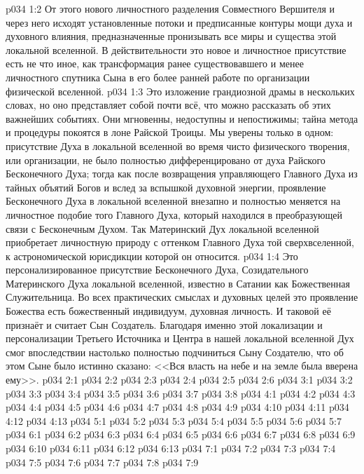 \vs p034 1:2 От этого нового личностного разделения Совместного Вершителя и через него исходят установленные потоки и предписанные контуры мощи духа и духовного влияния, предназначенные пронизывать все миры и существа этой локальной вселенной. В действительности это новое и личностное присутствие есть не что иное, как трансформация ранее существовавшего и менее личностного спутника Сына в его более ранней работе по организации физической вселенной.
\vs p034 1:3 \pc Это изложение грандиозной драмы в нескольких словах, но оно представляет собой почти всё, что можно рассказать об этих важнейших событиях. Они мгновенны, недоступны и непостижимы; тайна метода и процедуры покоятся в лоне Райской Троицы. Мы уверены только в одном: присутствие Духа в локальной вселенной во время чисто физического творения, или организации, не было полностью дифференцировано от духа Райского Бесконечного Духа; тогда как после возвращения управляющего Главного Духа из тайных объятий Богов и вслед за вспышкой духовной энергии, проявление Бесконечного Духа в локальной вселенной внезапно и полностью меняется на личностное подобие того Главного Духа, который находился в преобразующей связи с Бесконечным Духом. Так Материнский Дух локальной вселенной приобретает личностную природу с оттенком Главного Духа той сверхвселенной, к астрономической юрисдикции которой он относится.
\vs p034 1:4 Это персонализированное присутствие Бесконечного Духа, Созидательного Материнского Духа локальной вселенной, известно в Сатании как Божественная Служительница. Во всех практических смыслах и духовных целей это проявление Божества есть божественный индивидуум, духовная личность. И таковой её признаёт и считает Сын Создатель. Благодаря именно этой локализации и персонализации Третьего Источника и Центра в нашей локальной вселенной Дух смог впоследствии настолько полностью подчиниться Сыну Создателю, что об этом Сыне было истинно сказано: <<Вся власть на небе и на земле была вверена ему>>.
\vs p034 2:1 
\vs p034 2:2 
\vs p034 2:3 \pc 
\vs p034 2:4 \pc 
\vs p034 2:5 
\vs p034 2:6 \pc 
{}
\vs p034 3:1 
\vs p034 3:2 
\vs p034 3:3 \pc 
\vs p034 3:4 
\vs p034 3:5 \pc 
\vs p034 3:6 
\vs p034 3:7 \pc 
\vs p034 3:8 
\vs p034 4:1 
\vs p034 4:2 
\vs p034 4:3 
\vs p034 4:4 
\vs p034 4:5 \pc 
\vs p034 4:6 
\vs p034 4:7 
\vs p034 4:8 \pc 
\vs p034 4:9 
\vs p034 4:10 \pc 
\vs p034 4:11 \pc 
\vs p034 4:12 
\vs p034 4:13 
\vs p034 5:1 
\vs p034 5:2 
\vs p034 5:3 \pc 
\vs p034 5:4 
\vs p034 5:5 
\vs p034 5:6 \pc 
\vs p034 5:7 
\vs p034 6:1 
\vs p034 6:2 
\vs p034 6:3 \pc 
\vs p034 6:4 
\vs p034 6:5 \pc 
\vs p034 6:6 
\vs p034 6:7 
\vs p034 6:8 
\vs p034 6:9 \pc 
\vs p034 6:10 
\vs p034 6:11 \pc 
\vs p034 6:12 
\vs p034 6:13 
\vs p034 7:1 
\vs p034 7:2 
\vs p034 7:3 
\vs p034 7:4 \pc 
\vs p034 7:5 
\vs p034 7:6 \pc 
\vs p034 7:7 
\vs p034 7:8 \pc 
\vsetoff
\vs p034 7:9 
\quizlink
